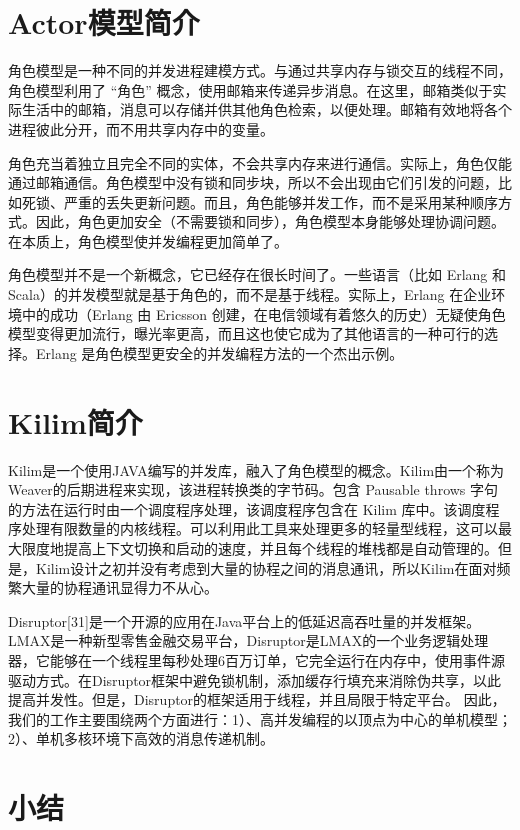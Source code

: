 \section{Actor模型简介}

角色模型是一种不同的并发进程建模方式。与通过共享内存与锁交互的线程不同，角色模型利用了 “角色” 概念，使用邮箱来传递异步消息。在这里，邮箱类似于实际生活中的邮箱，消息可以存储并供其他角色检索，以便处理。邮箱有效地将各个进程彼此分开，而不用共享内存中的变量。

角色充当着独立且完全不同的实体，不会共享内存来进行通信。实际上，角色仅能通过邮箱通信。角色模型中没有锁和同步块，所以不会出现由它们引发的问题，比如死锁、严重的丢失更新问题。而且，角色能够并发工作，而不是采用某种顺序方式。因此，角色更加安全（不需要锁和同步），角色模型本身能够处理协调问题。在本质上，角色模型使并发编程更加简单了。

角色模型并不是一个新概念，它已经存在很长时间了。一些语言（比如 Erlang 和 Scala）的并发模型就是基于角色的，而不是基于线程。实际上，Erlang 在企业环境中的成功（Erlang 由 Ericsson 创建，在电信领域有着悠久的历史）无疑使角色模型变得更加流行，曝光率更高，而且这也使它成为了其他语言的一种可行的选择。Erlang 是角色模型更安全的并发编程方法的一个杰出示例。


\section{Kilim简介}

Kilim是一个使用JAVA编写的并发库，融入了角色模型的概念。Kilim由一个称为Weaver的后期进程来实现，该进程转换类的字节码。包含 Pausable throws 字句的方法在运行时由一个调度程序处理，该调度程序包含在 Kilim 库中。该调度程序处理有限数量的内核线程。可以利用此工具来处理更多的轻量型线程，这可以最大限度地提高上下文切换和启动的速度，并且每个线程的堆栈都是自动管理的。但是，Kilim设计之初并没有考虑到大量的协程之间的消息通讯，所以Kilim在面对频繁大量的协程通讯显得力不从心。

Disruptor[31]是一个开源的应用在Java平台上的低延迟高吞吐量的并发框架。LMAX是一种新型零售金融交易平台，Disruptor是LMAX的一个业务逻辑处理器，它能够在一个线程里每秒处理6百万订单，它完全运行在内存中，使用事件源驱动方式。在Disruptor框架中避免锁机制，添加缓存行填充来消除伪共享，以此提高并发性。但是，Disruptor的框架适用于线程，并且局限于特定平台。
因此，我们的工作主要围绕两个方面进行：1）、高并发编程的以顶点为中心的单机模型；2）、单机多核环境下高效的消息传递机制。


\section{小结}